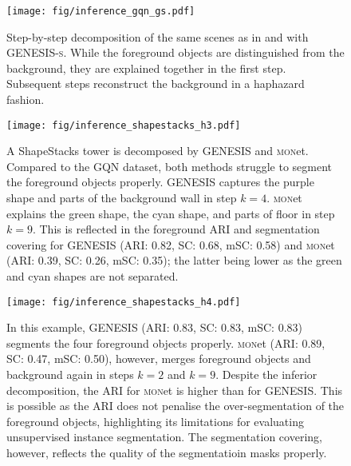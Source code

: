 \documentclass{article}
\begin{document}
\begin{figure}[h]
    \centering
    \texttt{[image: fig/inference\_gqn\_gs.pdf]}
    \caption{Step-by-step decomposition of the same scenes as in  and  with \mbox{\gls{GENESIS}\textsc{-s}}. While the foreground objects are distinguished from the background, they are explained together in the first step. Subsequent steps reconstruct the background in a haphazard fashion.}
    \label{fig:inference_gqn_gs}
\end{figure}

\begin{figure}[h]
    \centering
    \texttt{[image: fig/inference\_shapestacks\_h3.pdf]}
    \caption{A ShapeStacks tower is decomposed by \gls{GENESIS} and \textsc{mon}et.
    Compared to the GQN dataset, both methods struggle to segment the foreground objects properly. \gls{GENESIS} captures the purple shape and parts of the background wall in step $k=4$. \textsc{mon}et explains the green shape, the cyan shape, and parts of floor in step $k=9$.
    This is reflected in the foreground ARI and segmentation covering for \gls{GENESIS} (ARI: 0.82, SC: 0.68, mSC: 0.58) and \textsc{mon}et (ARI: 0.39, SC: 0.26, mSC: 0.35); the latter being lower as the green and cyan shapes are not separated.}
    \label{fig:decomposition_shapestacks_h3}
\end{figure}

\begin{figure}[h]
    \centering
    \texttt{[image: fig/inference\_shapestacks\_h4.pdf]}
    \caption{In this example, \gls{GENESIS} (ARI: 0.83, SC: 0.83, mSC: 0.83) segments the four foreground objects properly.
    \textsc{mon}et (ARI: 0.89, SC: 0.47, mSC: 0.50), however, merges foreground objects and background again in steps $k=2$ and $k=9$.
    Despite the inferior decomposition, the ARI for \textsc{mon}et is higher than for \mbox{\gls{GENESIS}}. This is possible as the ARI does not penalise the over-segmentation of the foreground objects, highlighting its limitations for evaluating unsupervised instance segmentation. The segmentation covering, however, reflects the quality of the segmentatioin masks properly.}
    \label{fig:decomposition_shapestacks_h4}
\end{figure}






















 
\end{document}
